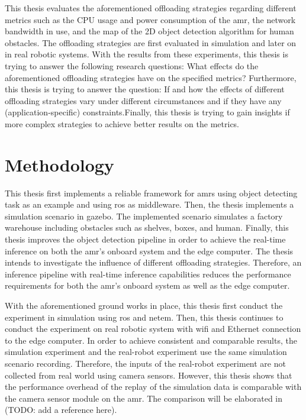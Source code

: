 This thesis evaluates the aforementioned offloading strategies regarding different metrics such as the CPU usage and power consumption of the \gls{amr}, the network bandwidth in use, and the \gls{map} of the 2D object detection algorithm for human obstacles. The offloading strategies are first evaluated in simulation and later on in real robotic systems. With the results from these experiments, this thesis is trying to answer the following research questions: What effects do the aforementioned offloading strategies have on the specified metrics? Furthermore, this thesis is trying to answer the question: If and how the effects of different offloading strategies vary under different circumstances and if they have any (application-specific) constraints.Finally, this thesis is trying to gain insights if more complex strategies to achieve better results on the metrics. 

\section{Methodology}\label{sec:introduction:methodology}

This thesis first implements a reliable framework for \glspl{amr} using object detecting task as an example and using \gls{ros} as middleware. Then, the thesis implements a simulation scenario in \gls{gazebo}. The implemented scenario simulates a factory warehouse including obstacles such as shelves, boxes, and human. Finally, this thesis improves the object detection pipeline in order to achieve the real-time inference on both the \gls{amr}'s onboard system and the edge computer. The thesis intends to investigate the influence of different offloading strategies. Therefore, an inference pipeline with real-time inference capabilities reduces the performance requirements for both the \gls{amr}'s onboard system as well as the edge computer.

With the aforementioned ground works in place, this thesis first conduct the experiment in simulation using \gls{ros} and \gls{netem}. Then, this thesis continues to conduct the experiment on real robotic system with \gls{wifi} and Ethernet connection to the edge computer. In order to achieve consistent and comparable results, the simulation experiment and the real-robot experiment use the same simulation scenario recording. Therefore, the inputs of the real-robot experiment are not collected from real world using camera sensors. However, this thesis shows that the performance overhead of the replay of the simulation data is comparable with the camera sensor module on the \gls{amr}. The comparison will be elaborated in (TODO: add a reference here). 

